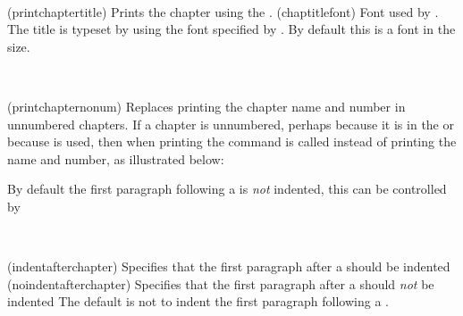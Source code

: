 \begin{syntax}
\cmd{\printchaptertitle} \cmd{\chaptitlefont} \\
\end{syntax}
\glossary(printchaptertitle)%
  {}%
  {Prints the chapter  using the .}
\glossary(chaptitlefont)%
  {}%
  {Font used by .}
The title is typeset by \cmd{\printchaptertitle} using the font specified 
by \cmd{\chaptitlefont}. 
By default this is a \cmd{\bfseries} font in the \cmd{\Huge} size. 

\begin{syntax}
\cmd{\printchapternonum} \\
\end{syntax}
\glossary(printchapternonum)%
  {}%
  {Replaces printing the chapter name and number in unnumbered chapters.}
If a chapter is unnumbered, perhaps because it is in the \cmd{\frontmatter}
or because \cmd{\chapter*} is used, then when printing the command
\cmd{\printchapternonum} is called instead of printing the name and number,
as illustrated below:
\begin{lcode}
\newcommand{\chapterhead}[1]{ %
  \clearforchapter        %
  \thispagestyle{chapter} %
  \insertchapterspace     %
  \chapterheadstart       %
  \printchaptername\chapternamenum\printchapternum
  \afterchapternum        %
  \printchaptertitle{#1}  %
  \afterchaptertitle}     %
\end{lcode}
%
%
%
By default the first paragraph following a  is \emph{not}
indented, this can be controlled by
\begin{syntax}
  \cmd{\indentafterchapter}\\
  \cmd{\noindentafterchapter}
\end{syntax}
\glossary(indentafterchapter)%
{}%
{Specifies that the first paragraph after a  should be indented}
\glossary(noindentafterchapter)%
{}%
{Specifies that the first paragraph after a  should \emph{not} be indented}
The default is not to indent the first paragraph following a
.


